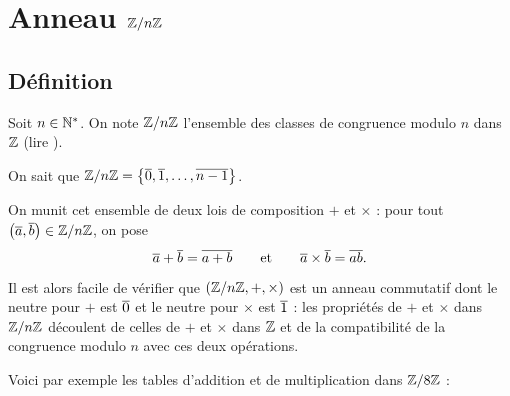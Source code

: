 \section{Anneau \(\mathbb{Z}/n\mathbb{Z}\)}

\subsection{Définition}

Soit \(n\in\mathbb{N}^*\). On note \(\mathbb{Z}/n\mathbb{Z}\) l'ensemble des classes de congruence modulo \(n\) dans \(\mathbb{Z}\) (lire ).

On sait que \(\mathbb{Z}/n\mathbb{Z}=\left\lbrace\overline{0},\overline{1},\dots,\overline{n-1}\right\rbrace\).

On munit cet ensemble de deux lois de composition \(+\) et \(\times\) : pour tout \(\left(\overline{a},\overline{b}\right)\in\mathbb{Z}/n\mathbb{Z}\), on pose \[\overline{a}+\overline{b}=\overline{a+b}\qquad\text{et}\qquad\overline{a}\times\overline{b}=\overline{ab}.\]

Il est alors facile de vérifier que \(\anneau{\znz{n}}[+][\times]\) est un anneau commutatif dont le neutre pour \(+\) est \(\overline{0}\) et le neutre pour \(\times\) est \(\overline{1}\) : les propriétés de \(+\) et \(\times\) dans \(\mathbb{Z}/n\mathbb{Z}\) découlent de celles de \(+\) et \(\times\) dans \(\mathbb{Z}\) et de la compatibilité de la congruence modulo \(n\) avec ces deux opérations.

Voici par exemple les tables d'addition et de multiplication dans \(\mathbb{Z}/8\mathbb{Z}\) :

